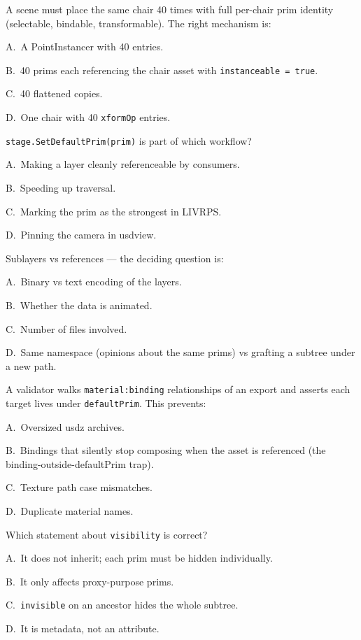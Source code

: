 A scene must place the same chair 40 times with full per-chair prim identity
(selectable, bindable, transformable). The right mechanism is:
\begin{Choices}
  \item A.\ A PointInstancer with 40 entries.
  \item B.\ 40 prims each referencing the chair asset with \texttt{instanceable = true}.
  \item C.\ 40 flattened copies.
  \item D.\ One chair with 40 \texttt{xformOp} entries.
\end{Choices}

\texttt{stage.SetDefaultPrim(prim)} is part of which workflow?
\begin{Choices}
  \item A.\ Making a layer cleanly referenceable by consumers.
  \item B.\ Speeding up traversal.
  \item C.\ Marking the prim as the strongest in LIVRPS.
  \item D.\ Pinning the camera in usdview.
\end{Choices}

Sublayers vs references --- the deciding question is:
\begin{Choices}
  \item A.\ Binary vs text encoding of the layers.
  \item B.\ Whether the data is animated.
  \item C.\ Number of files involved.
  \item D.\ Same namespace (opinions about the same prims) vs grafting a subtree under a new path.
\end{Choices}

A validator walks \texttt{material:binding} relationships of an export and
asserts each target lives under \texttt{defaultPrim}. This prevents:
\begin{Choices}
  \item A.\ Oversized usdz archives.
  \item B.\ Bindings that silently stop composing when the asset is referenced (the binding-outside-defaultPrim trap).
  \item C.\ Texture path case mismatches.
  \item D.\ Duplicate material names.
\end{Choices}

Which statement about \texttt{visibility} is correct?
\begin{Choices}
  \item A.\ It does not inherit; each prim must be hidden individually.
  \item B.\ It only affects proxy-purpose prims.
  \item C.\ \texttt{invisible} on an ancestor hides the whole subtree.
  \item D.\ It is metadata, not an attribute.
\end{Choices}

